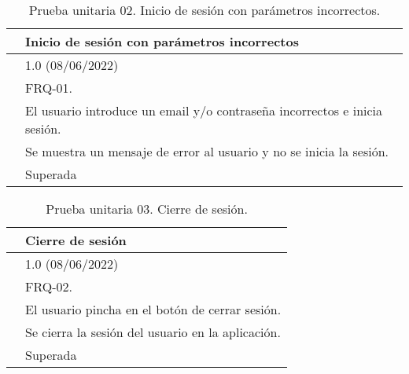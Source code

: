 \begin{table}[H]
\begin{center}
\begin{tabular}{|p{3cm}|p{10cm}|} \hline
\centering {\bf PU-02} & Inicio de sesión con parámetros incorrectos  \\ \hline\hline
\centering {\bf Versión} & 1.0 (08/06/2022) \\ \hline
\centering {\bf Dependencias} & FRQ-01. \\ \hline
\centering {\bf Descripción} &  El usuario introduce un email y/o contraseña incorrectos e inicia sesión. \\ \hline
\centering {\bf Criterio de aceptación} & Se muestra un mensaje de error al usuario y no se inicia la sesión. \\ \hline
\centering {\bf Estado} & Superada \\ \hline
\end{tabular}
\caption{Prueba unitaria 02. Inicio de sesión con parámetros incorrectos.}
\label{enlacePU2}
\end{center}
\end{table}

\begin{table}[H]
\begin{center}
\begin{tabular}{|p{3cm}|p{10cm}|} \hline
\centering {\bf PU-03} & Cierre de sesión  \\ \hline\hline
\centering {\bf Versión} & 1.0 (08/06/2022) \\ \hline
\centering {\bf Dependencias} & FRQ-02. \\ \hline
\centering {\bf Descripción} &  El usuario pincha en el botón de cerrar sesión. \\ \hline
\centering {\bf Criterio de aceptación} & Se cierra la sesión del usuario en la aplicación. \\ \hline
\centering {\bf Estado} & Superada \\ \hline
\end{tabular}
\caption{Prueba unitaria 03. Cierre de sesión.}
\label{enlacePU3}
\end{center}
\end{table}

